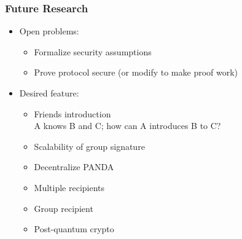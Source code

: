 \begin{frame}
	\frametitle{Future Research}

	\begin{itemize}
	\item	Open problems:
		\begin{itemize}
		\setlength\itemsep{0.3em}
		\item	Formalize security assumptions
		\item	Prove protocol secure (or modify to make proof work)
		\end{itemize}

	\vspace{0.5cm}
	\item	Desired feature:
		\begin{itemize}
		\setlength\itemsep{0.3em}
		\item	Friends introduction\\
			A knows B and C; how can A introduces B to C?
		\item	Scalability of group signature
		\item	Decentralize PANDA
		\item	Multiple recipients
		\item	Group recipient
		\item	Post-quantum crypto
		\end{itemize}
	\end{itemize}
\end{frame}

